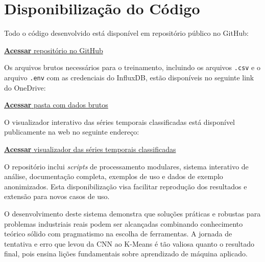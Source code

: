 \section{Disponibilização do Código}
\label{sec:disponibilizacao}

Todo o código desenvolvido está disponível em repositório público no GitHub:

\href{https://github.com/felcoslop/TCC_1_FELIPE_COSTA_LOPES}{\textbf{Acessar} repositório no GitHub}
\vspace{0.4cm}

Os arquivos brutos necessários para o treinamento, incluindo os arquivos \texttt{.csv} e o arquivo \texttt{.env} com as credenciais do InfluxDB, estão disponíveis no seguinte link do OneDrive:

\href{https://1drv.ms/f/c/5f1c3aa3f12af1a2/IgAXz-STR6zmRrccv2fN6JW9Aa4Qy9Yz6RLAjaxAfnqGuj8?e=ydZVsX}{\textbf{Acessar} pasta com dados brutos}
\vspace{0.4cm}

O visualizador interativo das séries temporais classificadas está disponível publicamente na web no seguinte endereço:

\href{https://evolution-tcc-felipe-costa-lopes-visualizador.hfzba0.easypanel.host/}{\textbf{Acessar} visualizador das séries temporais classificadas}
\vspace{0.4cm}

O repositório inclui \textit{scripts} de processamento modulares, sistema interativo de análise, documentação completa, exemplos de uso e dados de exemplo anonimizados. Esta disponibilização visa facilitar reprodução dos resultados e extensão para novos casos de uso.

O desenvolvimento deste sistema demonstra que soluções práticas e robustas para problemas industriais reais podem ser alcançadas combinando conhecimento teórico sólido com pragmatismo na escolha de ferramentas. A jornada de tentativa e erro que levou da CNN ao K-Means é tão valiosa quanto o resultado final, pois ensina lições fundamentais sobre aprendizado de máquina aplicado.

\clearpage
